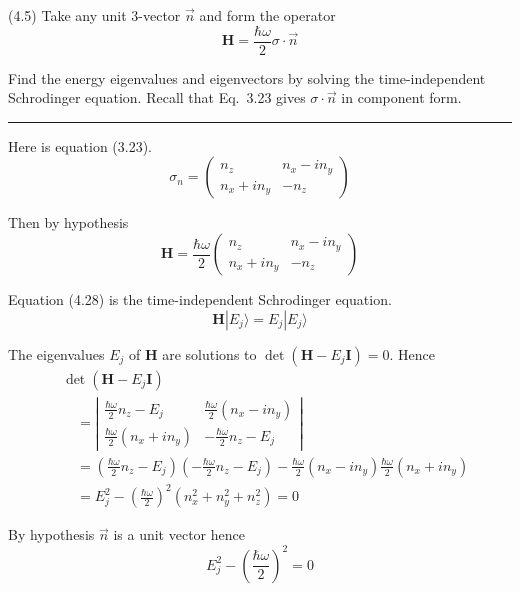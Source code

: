 \documentclass[12pt]{article}
\begin{document}
(4.5)
Take any unit 3-vector $\vec n$ and form the operator
\begin{equation*}
\mathbf H=\frac{\hbar\omega}{2}\sigma\cdot\vec n
\end{equation*}

Find the energy eigenvalues and eigenvectors by solving the
time-independent Schrodinger equation.
Recall that Eq.~3.23 gives $\sigma\cdot\vec n$ in component form.

\bigskip
\hrule

\bigskip
Here is equation (3.23).
\begin{equation*}
\sigma_n=\begin{pmatrix}
n_z & n_x-in_y
\\
n_x+in_y & -n_z
\end{pmatrix}
\tag{3.23}
\end{equation*}

Then by hypothesis
\begin{equation*}
\mathbf H=\frac{\hbar\omega}{2}
\begin{pmatrix}
n_z & n_x-in_y
\\
n_x+in_y & -n_z
\end{pmatrix}
\end{equation*}

Equation (4.28) is the time-independent Schrodinger equation.
\begin{equation*}
\mathbf H|E_j\rangle=E_j|E_j\rangle
\tag{4.28}
\end{equation*}

The eigenvalues $E_j$ of $\mathbf H$ are solutions to $\det(\mathbf H-E_j\mathbf I)=0$.
Hence
\begin{align*}
&\det(\mathbf H-E_j\mathbf I)
\\
&\quad{}=\left|
\begin{matrix}
\frac{\hbar\omega}{2}n_z-E_j & \frac{\hbar\omega}{2}(n_x-in_y)
\\[1ex]
\frac{\hbar\omega}{2}(n_x+in_y) & -\frac{\hbar\omega}{2}n_z-E_j
\end{matrix}
\right|
\\
&\quad{}=\left(\frac{\hbar\omega}{2}n_z-E_j\right)\left(-\frac{\hbar\omega}{2}n_z-E_j\right)
-\frac{\hbar\omega}{2}(n_x-in_y)\frac{\hbar\omega}{2}(n_x+in_y)
\\
&\quad{}=E_j^2-\left(\frac{\hbar\omega}{2}\right)^2\left(n_x^2+n_y^2+n_z^2\right)=0
\end{align*}

By hypothesis $\vec n$ is a unit vector hence
\begin{equation*}
E_j^2-\left(\frac{\hbar\omega}{2}\right)^2=0
\end{equation*}
\end{document}
